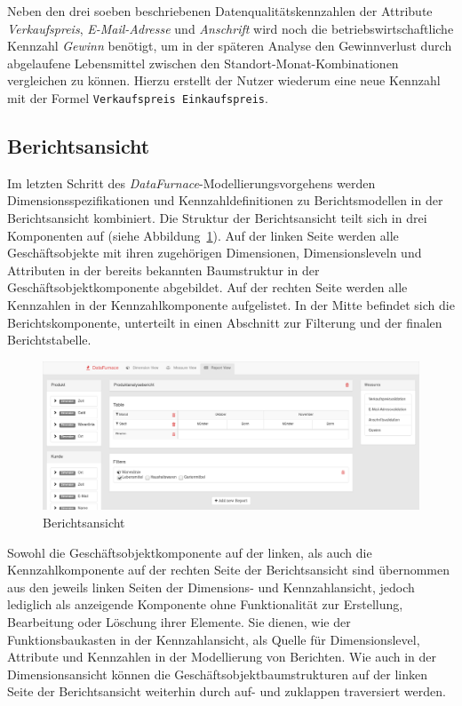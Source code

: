 \documentclass[
  language=german, %
  type=bachelor,%
  ngerman
]{isthesis}
\begin{document}
\begin{content}
  Neben den drei soeben beschriebenen Datenqualitätskennzahlen der Attribute
  \textit{Verkaufspreis}, \textit{E-Mail-Adresse} und \textit{Anschrift} wird
  noch die betriebswirtschaftliche Kennzahl \textit{Gewinn} benötigt, um in der
  späteren Analyse den Gewinnverlust durch abgelaufene Lebensmittel zwischen
  den Standort-Monat-Kombinationen vergleichen zu können. Hierzu erstellt der
  Nutzer wiederum eine neue Kennzahl mit der Formel \texttt{Verkaufspreis \textminus{}
  Einkaufspreis}.


  \subsection{Berichtsansicht}\label{subsec:berichtsansicht}

  Im letzten Schritt des \textit{DataFurnace}-Modellierungsvorgehens werden
  Dimensionsspezifikationen und Kennzahldefinitionen zu Berichtsmodellen in der
  Berichtsansicht kombiniert. Die Struktur der Berichtsansicht teilt sich in
  drei Komponenten auf (siehe Abbildung~\ref{berichtsansicht}). Auf der linken
  Seite werden alle Geschäftsobjekte mit ihren zugehörigen Dimensionen,
  Dimensionsleveln und Attributen in der bereits bekannten Baumstruktur in der
  Geschäftsobjektkomponente abgebildet.  Auf der rechten Seite werden alle
  Kennzahlen in der Kennzahlkomponente aufgelistet. In der Mitte befindet sich
  die Berichtskomponente, unterteilt in einen Abschnitt zur Filterung und der
  finalen Berichtstabelle.

  \begin{figure}
    \includegraphics[scale=0.29]{content/figures/report-view.png}
    \caption{Berichtsansicht}\label{berichtsansicht}
  \end{figure}

  Sowohl die Geschäftsobjektkomponente auf der linken, als auch die
  Kennzahlkomponente auf der rechten Seite der Berichtsansicht sind übernommen
  aus den jeweils linken Seiten der Dimensions- und Kennzahlansicht, jedoch
  lediglich als anzeigende Komponente ohne Funktionalität zur Erstellung,
  Bearbeitung oder Löschung ihrer Elemente. Sie dienen, wie der
  Funktionsbaukasten in der Kennzahlansicht, als Quelle für Dimensionslevel,
  Attribute und Kennzahlen in der Modellierung von Berichten. Wie auch in der
  Dimensionsansicht können die Geschäftsobjektbaumstrukturen auf der linken
  Seite der Berichtsansicht weiterhin durch auf- und zuklappen traversiert
  werden.


\end{content}
\end{document}
